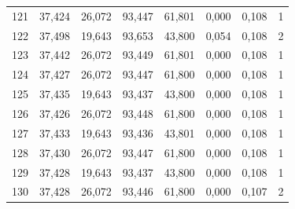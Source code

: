 \documentclass[10pt,a4paper]{article}
\begin{document}
\begin{longtable}{rrrrrrrr}
121 & 37,424 & 26,072 & 93,447 & 61,801 & 0,000 & 0,108 & 1\\
122 & 37,498 & 19,643 & 93,653 & 43,800 & 0,054 & 0,108 & 2\\
123 & 37,442 & 26,072 & 93,449 & 61,801 & 0,000 & 0,108 & 1\\
124 & 37,427 & 26,072 & 93,447 & 61,800 & 0,000 & 0,108 & 1\\
125 & 37,435 & 19,643 & 93,437 & 43,800 & 0,000 & 0,108 & 1\\
126 & 37,426 & 26,072 & 93,448 & 61,800 & 0,000 & 0,108 & 1\\
127 & 37,433 & 19,643 & 93,436 & 43,801 & 0,000 & 0,108 & 1\\
128 & 37,430 & 26,072 & 93,447 & 61,800 & 0,000 & 0,108 & 1\\
129 & 37,428 & 19,643 & 93,437 & 43,800 & 0,000 & 0,108 & 1\\
130 & 37,428 & 26,072 & 93,446 & 61,800 & 0,000 & 0,107 & 2\\
\end{longtable}

\end{document}
